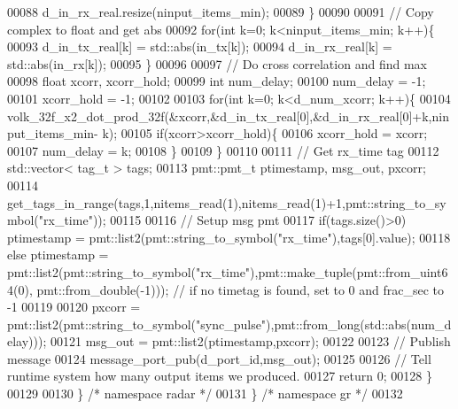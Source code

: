 \begin{DoxyCode}
00088             d_in_rx_real.resize(ninput\_items\_min);
00089         \}
00090         
00091         \textcolor{comment}{// Copy complex to float and get abs}
00092         \textcolor{keywordflow}{for}(\textcolor{keywordtype}{int} k=0; k<ninput\_items\_min; k++)\{
00093             d_in_tx_real[k] = std::abs(in\_tx[k]);
00094             d_in_rx_real[k] = std::abs(in\_rx[k]);
00095         \}
00096         
00097         \textcolor{comment}{// Do cross correlation and find max}
00098         \textcolor{keywordtype}{float} xcorr, xcorr\_hold;
00099         \textcolor{keywordtype}{int} num\_delay;
00100         num\_delay = -1;
00101         xcorr\_hold = -1;
00102         
00103         \textcolor{keywordflow}{for}(\textcolor{keywordtype}{int} k=0; k<d_num_xcorr; k++)\{
00104             volk\_32f\_x2\_dot\_prod\_32f(&xcorr,&d_in_tx_real[0],&d_in_rx_real[0]+k,ninput\_items\_min-
      k);
00105             \textcolor{keywordflow}{if}(xcorr>xcorr\_hold)\{
00106                 xcorr\_hold = xcorr;
00107                 num\_delay = k;
00108             \}
00109         \}
00110         
00111         \textcolor{comment}{// Get rx\_time tag}
00112         std::vector< tag\_t > tags;
00113         pmt::pmt\_t ptimestamp, msg\_out, pxcorr;
00114         get\_tags\_in\_range(tags,1,nitems\_read(1),nitems\_read(1)+1,pmt::string\_to\_symbol(\textcolor{stringliteral}{"rx\_time"}));
00115         
00116         \textcolor{comment}{// Setup msg pmt}
00117         \textcolor{keywordflow}{if}(tags.size()>0) ptimestamp = pmt::list2(pmt::string\_to\_symbol(\textcolor{stringliteral}{"rx\_time"}),tags[0].value);
00118         \textcolor{keywordflow}{else} ptimestamp = pmt::list2(pmt::string\_to\_symbol(\textcolor{stringliteral}{"rx\_time"}),pmt::make\_tuple(pmt::from\_uint64(0),
      pmt::from\_double(-1))); \textcolor{comment}{// if no timetag is found, set to 0 and frac\_sec to -1}
00119         
00120         pxcorr = pmt::list2(pmt::string\_to\_symbol(\textcolor{stringliteral}{"sync\_pulse"}),pmt::from\_long(std::abs(num\_delay)));
00121         msg\_out = pmt::list2(ptimestamp,pxcorr);
00122         
00123         \textcolor{comment}{// Publish message}
00124         message\_port\_pub(d_port_id,msg\_out);
00125 
00126         \textcolor{comment}{// Tell runtime system how many output items we produced.}
00127         \textcolor{keywordflow}{return} 0;
00128     \}
00129 
00130   \} \textcolor{comment}{/* namespace radar */}
00131 \} \textcolor{comment}{/* namespace gr */}
00132 
\end{DoxyCode}
